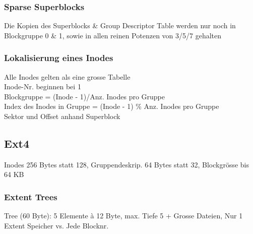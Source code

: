 \subsubsection{Sparse Superblocks}
Die Kopien des Superblocks \& Group Descriptor Table werden nur noch in Blockgruppe 0 \& 1, sowie in allen reinen Potenzen von 3/5/7 gehalten

\subsubsection{Lokalisierung eines Inodes}
Alle Inodes gelten als eine grosse Tabelle\\
Inode-Nr. beginnen bei 1\\
Blockgruppe = (Inode - 1)/Anz. Inodes pro Gruppe\\
Index des Inodes in Gruppe = (Inode - 1) \% Anz. Inodes pro Gruppe\\
Sektor und Offset anhand Superblock


\subsection{Ext4}
Inodes 256 Bytes statt 128, Gruppendeskrip. 64 Bytes statt 32, Blockgrösse bis 64 KB

\subsubsection{Extent Trees}
Tree (60 Byte): 5 Elemente à 12 Byte, max. Tiefe 5
+ Grosse Dateien, Nur 1 Extent Speicher vs. Jede Blocknr.

